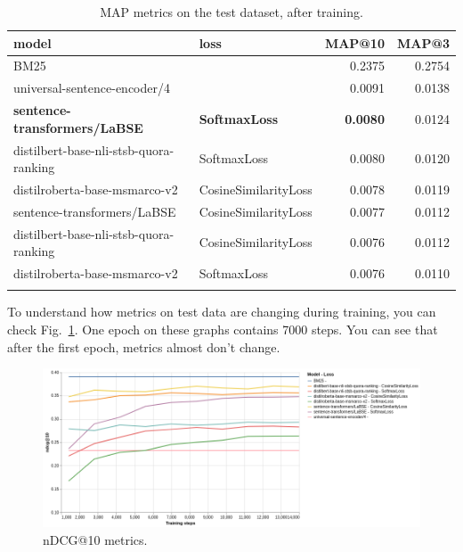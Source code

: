 \documentclass{article}
\begin{document}
\begin{table}[hbt!]
\centering
\caption{MAP metrics on the test dataset, after training.}
\begin{tabular}{llrr}
\toprule
                             model &         loss &  \textbf{MAP@10} &  MAP@3 \\
\midrule

                                   BM25 &                       &          0.2375 &         0.2754 \\
           universal-sentence-encoder/4 &                       &          0.0091 &         0.0138 \\
            \textbf{sentence-transformers/LaBSE} &           \textbf{SoftmaxLoss} &          \textbf{0.0080} &         0.0124 \\
 distilbert-base-nli-stsb-quora-ranking &           SoftmaxLoss &          0.0080 &         0.0120 \\
          distilroberta-base-msmarco-v2 &  CosineSimilarityLoss &          0.0078 &         0.0119 \\
            sentence-transformers/LaBSE &  CosineSimilarityLoss &          0.0077 &         0.0112 \\
 distilbert-base-nli-stsb-quora-ranking &  CosineSimilarityLoss &          0.0076 &         0.0112 \\
          distilroberta-base-msmarco-v2 &           SoftmaxLoss &          0.0076 &         0.0110 \\
           
\bottomrule           
\label{tab:results_map}
\end{tabular}
\end{table}

To understand how metrics on test data are changing during training, you can check Fig.~\ref{fig:ndcg10}. One epoch on these graphs contains 7000 steps. You can see that after the first epoch, metrics almost don't change.

\begin{figure}[hbt!]
    \centering
    \includegraphics[width=1\linewidth]{visualization_ndcg10.png}
    \caption{nDCG@10 metrics.}
    \label{fig:ndcg10}
\end{figure}
\end{document}
